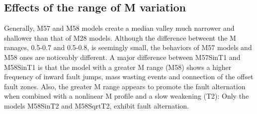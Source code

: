 


\subsection{Effects of the range of M variation}
Generally, M57 and M58 models create a median valley much narrower and shallower than that of M28 models.
Although the difference betweent the M ranages, 0.5-0.7 and 0.5-0.8, is seemingly small, the behaviors of M57 models and M58 ones are noticeably different.
A major difference between M57SinT1 and M58SinT1 is that the model with a greater M range (M58) shows a higher frequency of inward fault jumps, mass wasting events and connection of the offset fault zones. Also, the greater M range appears to promote the fault alternation when combined with a nonlinear M profile and a slow weakening (T2): Only the models M58SinT2 and M58SqrtT2, exhibit fault alternation.


